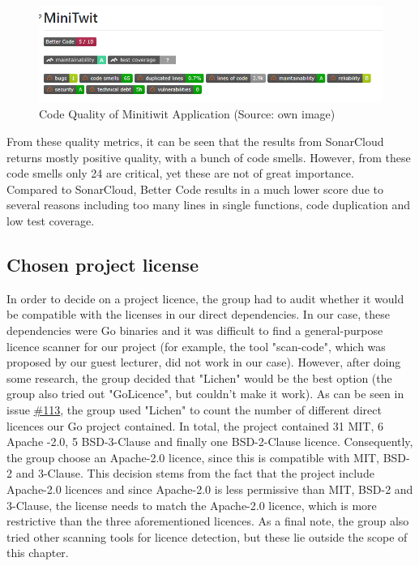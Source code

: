 \begin{figure}[!ht]
    \centering
    \captionsetup{justification=centering,margin=1cm}
    \includegraphics[width=\linewidth]{images/code_quality.png}
    \caption{Code Quality of Minitiwit Application (Source: own image)}
    \label{fig:CodeQuality}
\end{figure}
From these quality metrics, it can be seen that the results from SonarCloud returns mostly positive quality, with a bunch of code smells. However, from these code smells only 24 are critical, yet these are not of great importance. \\
Compared to SonarCloud, Better Code results in a much lower score due to several reasons including too many lines in single functions, code duplication and low test coverage.

\subsection{Chosen project license}
In order to decide on a project licence, the group had to audit whether it would be compatible with the licenses in our direct dependencies. In our case, these dependencies were Go binaries and it was difficult to find a general-purpose licence scanner for our project (for example, the tool "scan-code", which was proposed by our guest lecturer, did not work in our case). However, after doing some research, the group decided that "Lichen" would be the best option (the group also tried out "GoLicence", but couldn't make it work). As can be seen in issue \href{https://github.com/DevelOpsITU/MiniTwit/issues/134}{\#113}, the group used "Lichen" to count the number of different direct licences our Go project contained. In total, the project contained 31 MIT, 6 Apache -2.0, 5 BSD-3-Clause and finally one BSD-2-Clause licence. Consequently, the group choose an Apache-2.0 licence, since this is compatible with MIT, BSD-2 and 3-Clause. This decision stems from the fact that the project include Apache-2.0 licences and since Apache-2.0 is less permissive than MIT, BSD-2 and 3-Clause, the license needs to match the Apache-2.0 licence, which is more restrictive than the three aforementioned licences. As a final note, the group also tried other scanning tools for licence detection, but these lie outside the scope of this chapter.
